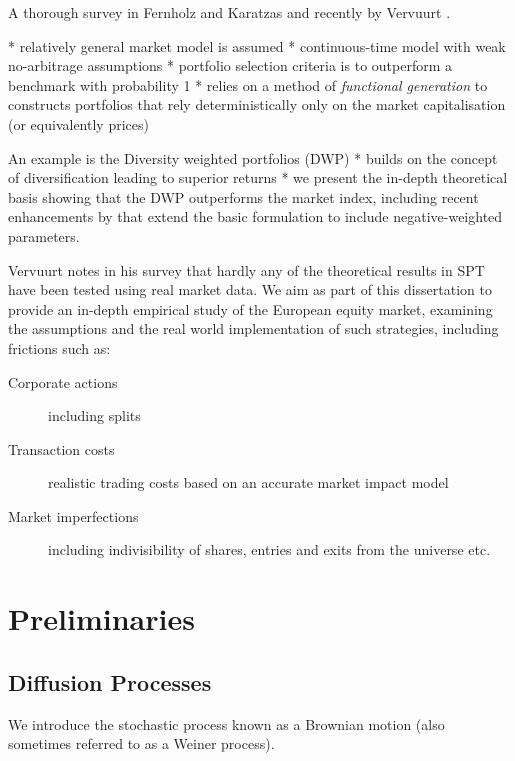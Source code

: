 \documentclass[british]{amsart}
\numberwithin{equation}{section}
\numberwithin{figure}{section}
\theoremstyle{plain}
\theoremstyle{definition}
\theoremstyle{plain}
\theoremstyle{plain}
\theoremstyle{plain}
\theoremstyle{remark}
\begin{document}
A thorough survey in Fernholz and Karatzas \cite{karatzas2009} and recently
by Vervuurt \cite{vervuurt2015}.

* relatively general market model is assumed
* continuous-time model with weak no-arbitrage assumptions
* portfolio selection criteria is to outperform a benchmark with probability 1
* relies on a method of \textit{functional generation} to constructs portfolios
that rely deterministically only on the market capitalisation (or equivalently 
prices)

An example is the Diversity weighted portfolios (DWP)
* builds on the concept of diversification leading to superior returns
* we present the in-depth theoretical basis showing that the DWP outperforms the 
market index, including recent enhancements by \cite{vervuurt2016} that
extend the basic formulation to include negative-weighted parameters.

Vervuurt \cite{vervuurt2015} notes in his survey that hardly any of the 
theoretical results in SPT have been tested using real market data. We aim as 
part of this dissertation to provide an in-depth empirical study of the European 
equity market, examining the assumptions and the real world implementation of
such strategies, including frictions such as:
\begin{description}
	\item [Corporate actions] including splits
	\item [Transaction costs] realistic trading costs based on an accurate 
		market impact model
	\item [Market imperfections] including indivisibility of shares, entries 
		and exits from the universe etc.
\end{description}

\section{Preliminaries}
\subsection{Diffusion Processes}

We introduce the stochastic process known as a Brownian motion (also sometimes 
referred to as a Weiner process).
\end{document}
